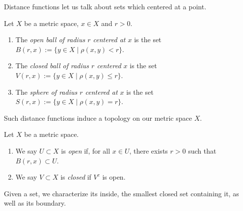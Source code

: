     Distance functions let us talk about sets which centered at a point.

    \begin{definition}
        Let $X$ be a metric space, $x \in X$ and $r > 0$.
        \begin{enumerate}[label = (\arabic*),itemsep=1pt,topsep=3pt]
            \item The \textit{open ball of radius $r$ centered at $x$} is the set $B(r,x):= \{y \in X \mid \rho(x,y) < r\}$.
            \item  The \textit{closed ball of radius $r$ centered $x$} is the set $V(r,x):= \{y \in X \mid \rho(x,y) \leq r\}$.
            \item The \textit{sphere of radius $r$ centered at $x$} is the set $S(r,x) := \{y \in X \mid \rho(x,y) = r\}$.
        \end{enumerate}
    \end{definition}

    Such distance functions induce a topology on our metric space $X$.

    \begin{definition}
        Let $X$ be a metric space. 
        \begin{enumerate}[label = (\arabic*),itemsep=1pt,topsep=3pt]
            \item We say $U \subset X$ is \textit{open} if, for all $x \in U$, there exists $r > 0$ such that $B(r,x) \subset U$.
            \item We say $V \subset X$ is \textit{closed} if $V^c$ is open.
        \end{enumerate}
    \end{definition}

    Given a set, we characterize its inside, the smallest closed set containing it, as well as its boundary.

